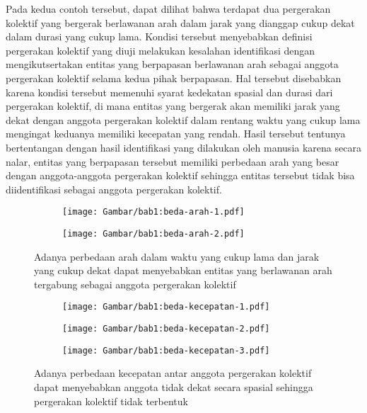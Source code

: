 Pada kedua contoh tersebut, dapat dilihat bahwa terdapat dua pergerakan kolektif yang bergerak berlawanan arah dalam jarak yang dianggap cukup dekat dalam durasi yang cukup lama. Kondisi tersebut menyebabkan definisi pergerakan kolektif yang diuji melakukan kesalahan identifikasi dengan mengikutsertakan entitas yang berpapasan berlawanan arah sebagai anggota pergerakan kolektif selama kedua pihak berpapasan. Hal tersebut disebabkan karena kondisi tersebut memenuhi syarat kedekatan spasial dan durasi dari pergerakan kolektif, di mana entitas yang bergerak akan memiliki jarak yang dekat dengan anggota pergerakan kolektif dalam rentang waktu yang cukup lama mengingat keduanya memiliki kecepatan yang rendah. Hasil tersebut tentunya bertentangan dengan hasil identifikasi yang dilakukan oleh manusia karena secara nalar, entitas yang berpapasan tersebut memiliki perbedaan arah yang besar dengan anggota-anggota pergerakan kolektif sehingga entitas tersebut tidak bisa diidentifikasi sebagai anggota pergerakan kolektif.

\begin{figure}[t]
    \centering
    \captionsetup{width=0.85\textwidth}
    \begin{subfigure}[h]{0.45\textwidth}
        \centering
        \texttt{[image: Gambar/bab1:beda-arah-1.pdf]}
    \end{subfigure} \hspace{0.25cm}
    \begin{subfigure}[h]{0.45\textwidth}
        \centering
        \texttt{[image: Gambar/bab1:beda-arah-2.pdf]}
    \end{subfigure}
    \caption[Masalah perbedaan arah pada identifikasi pergerakan kolektif]{Adanya perbedaan arah dalam waktu yang cukup lama dan jarak yang cukup dekat dapat menyebabkan entitas yang berlawanan arah tergabung sebagai anggota pergerakan kolektif}
    \label{bab1:beda-arah}
\end{figure}

\begin{figure}[t]
    \centering
    \captionsetup{width=0.75\textwidth}
    \begin{subfigure}[h]{0.25\textwidth}
        \centering
        \texttt{[image: Gambar/bab1:beda-kecepatan-1.pdf]}
    \end{subfigure}
    \begin{subfigure}[h]{0.25\textwidth}
        \centering
        \texttt{[image: Gambar/bab1:beda-kecepatan-2.pdf]}
    \end{subfigure}
    \begin{subfigure}[h]{0.25\textwidth}
        \centering
        \texttt{[image: Gambar/bab1:beda-kecepatan-3.pdf]}
    \end{subfigure}
    \caption[Masalah perbedaan kecepatan pada identifikasi pergerakan kolektif]{Adanya perbedaan kecepatan antar anggota pergerakan kolektif dapat menyebabkan anggota tidak dekat secara spasial sehingga pergerakan kolektif tidak terbentuk}
    \label{bab1:beda-kecepatan}
\end{figure}


